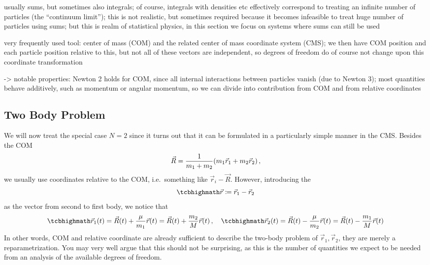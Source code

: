 \documentclass[../class_mech_main.tex]{subfiles}
\begin{document}
usually sums, but sometimes also integrals; of course, integrals with densities etc effectively correspond to treating an infinite number of particles (the \enquote{continuum limit});
this is not realistic, but sometimes required because it becomes infeasible to treat huge number of particles using sums; but this is realm of statistical physics, in this section we focus on systems where sums can still be used



very frequently used tool: center of mass (COM) and the related center of mass coordinate system (CMS); we then have COM position and each particle position relative to this, but not all of these vectors are independent, so degrees of freedom do of course not change upon this coordinate transformation


-> notable properties: Newton 2 holds for COM, since all internal interactions between particles vanish (due to Newton 3); most quantities behave additively, such as momentum or angular momentum, so we can divide into contribution from COM and from relative coordinates



	    \subsection{Two Body Problem}
We will now treat the special case $N = 2$ since it turns out that it can be formulated in a particularly simple manner in the CMS. Besides the COM
\begin{equation}
	\vec{R} = \frac{1}{m_1 + m_2} \qty(m_1 \vec{r}_1 + m_2 \vec{r}_2)
	\, ,
\end{equation}
we usually use coordinates relative to the COM, i.e.~something like $\vec{r}_i - \vec{R}$. However, introducing the 
\begin{equation}\label{eq:com_relative_coord}
	\eqbox{
		\vec{r} \coloneqq \vec{r}_1 - \vec{r}_2
	}
\end{equation}
as the vector from second to first body, we notice that
\begin{equation}\label{eq:trafo_com_components}
	\eqbox{
		\vec{r}_1(t) = \vec{R}(t) + \frac{\mu}{m_1} \vec{r}(t) = \vec{R}(t) + \frac{m_2}{M} \vec{r}(t)
	}
	\, , \quad
	\eqbox{
		\vec{r}_2(t) = \vec{R}(t) - \frac{\mu}{m_2} \vec{r}(t) = \vec{R}(t) - \frac{m_1}{M} \vec{r}(t)
	}
\end{equation}
In other words, COM and relative coordinate are already sufficient to describe the two-body problem of $\vec{r}_1, \vec{r}_2$, they are merely a reparametrization. You may very well argue that this should not be surprising, as this is the number of quantities we expect to be needed from an analysis of the available degrees of freedom.
\end{document}
